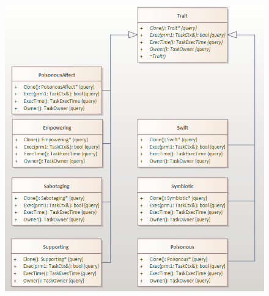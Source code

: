 \documentclass[CCGS.tex]{subfiles}
\begin{document}
\begin{figure}[H]
    \centering
    \includegraphics[width=\textwidth /4 *3]{CD3.png}
\end{figure}
\end{document}
